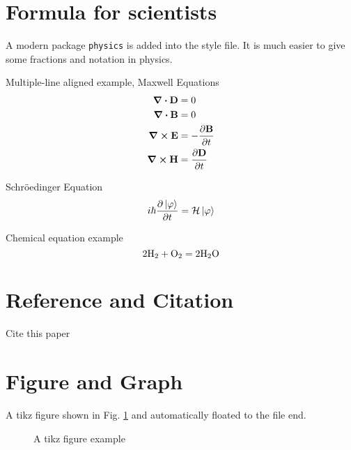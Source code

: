 \documentclass{kuee_en}
\begin{document}
\section{Formula for scientists}
A modern package \verb|physics| is added into the style file. It is much easier to give some fractions and notation in physics.
 
Multiple-line aligned example, Maxwell Equations
\begin{align}
    \div{\vb{D}} &= 0 \\
    \div{\vb{B}} &= 0 \\
    \curl{\vb{E}} &= -\pdv{\vb{B}}{t} \\
    \curl{\vb{H}} &= \pdv{\vb{D}}{t}
\end{align}

Schr\"{o}edinger Equation
\begin{equation}
	i\hbar \pdv{\ket{\varphi}}{t} = \mathcal{H} \ket{\varphi}
\end{equation}

Chemical equation example
\begin{equation*}
    2\ce{H2}+\ce{O2} = 2\ce{H2O}
\end{equation*}

\section{Reference and Citation}
Cite this paper
\cite{Yang2007}

\section{Figure and Graph}
A tikz figure shown in Fig. \ref{fig:tikz} and automatically floated to the file end.

\begin{figure}
    \centering
  \caption{A tikz figure example}
  \label{fig:tikz}
\end{figure}
\end{document}
